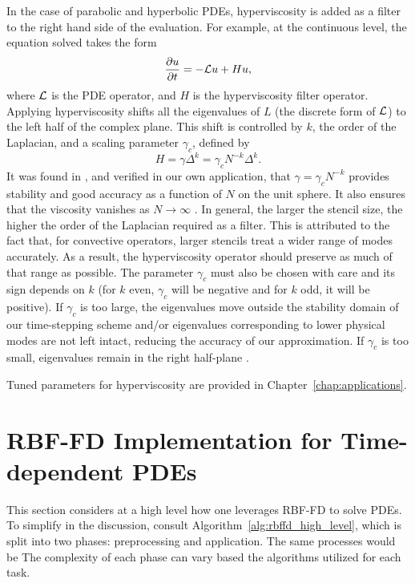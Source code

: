 \documentclass[11pt]{report}
\begin{document}
{In the case of parabolic and hyperbolic PDEs, hyperviscosity is added as a filter to the right hand side of the evaluation. For example, at the continuous level, 
the equation solved takes the form
\begin{equation}
\frac{\partial u}{\partial t} = - \mathcal{L}u + H u,
\label{eq:evaluation_with_hyperviscosity}
\end{equation}
where $\diffop$ is the PDE operator, and $H$ is the hyperviscosity filter operator.
Applying hyperviscosity shifts all the eigenvalues of $L$ (the discrete form of $\mathcal{L}$) to the left half of the complex plane. 
This shift is controlled by $k$, the order of the Laplacian, and a scaling parameter $\gamma_c$, defined by
\begin{equation*}	
H = \gamma \Delta^{k} = \gamma_c N^{-k} \Delta^{k}.
\end{equation*}
It was found in \cite{FlyerLehto11}, and verified in our own application, that $\gamma = \gamma_c N^{-k}$  provides stability and good accuracy 
as a function of $N$ on the unit sphere. It also ensures that the viscosity vanishes as $N\rightarrow\infty$ \cite{FlyerLehto11}.
In general, the larger the stencil size, the higher the order of the Laplacian required as a filter.  This is attributed to the fact that, for convective operators, larger stencils treat a wider range of modes accurately. As a result, the hyperviscosity operator should preserve as much of that range as possible. The parameter $\gamma_c$ must also be chosen with care and its sign depends on $k$ (for $k$ even, $\gamma_c$ will be negative and for $k$ odd, it will be positive). If $\gamma_c$ is too large, the eigenvalues move outside the stability domain of our time-stepping scheme and/or eigenvalues corresponding to lower physical modes are not left intact, reducing the accuracy of our approximation. If $\gamma_c$ is too small, eigenvalues remain in the right half-plane \cite{FornbergLehto11,FlyerLehto11}.

Tuned parameters for hyperviscosity are provided in Chapter~\ref{chap:applications}. 

\section{RBF-FD Implementation for Time-dependent PDEs}

This section considers at a high level how one leverages RBF-FD to solve PDEs. To simplify in the discussion, consult Algorithm~\ref{alg:rbffd_high_level}, which is split into two phases: preprocessing and application. The same processes would be The complexity of each phase can vary based the algorithms utilized for each task. 

}
\end{document}
